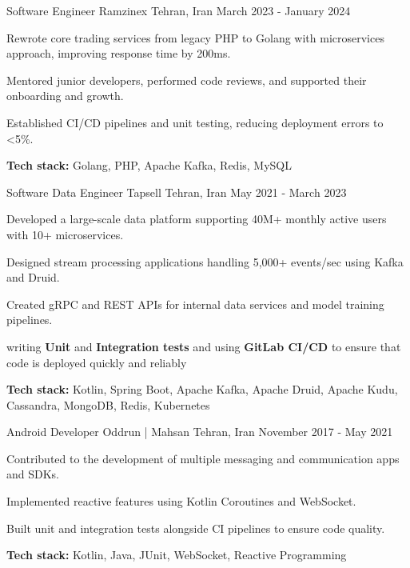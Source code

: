 \begin{cventries}
    
  \cventry
    {Software Engineer} %
    {Ramzinex} %
    {Tehran, Iran} %
    {March 2023 - January 2024} %
    {
      \begin{cvitems} %
        \item Rewrote core trading services from legacy PHP to Golang with microservices approach, improving response time by 200ms.
        \item Mentored junior developers, performed code reviews, and supported their onboarding and growth.
        \item Established CI/CD pipelines and unit testing, reducing deployment errors to <5\%.
        \item \textbf{Tech stack:} Golang, PHP, Apache Kafka, Redis, MySQL
      \end{cvitems}
    }

    \cventry
    {Software Data Engineer} %
    {Tapsell} %
    {Tehran, Iran} %
    {May 2021 - March 2023} %
    {
      \begin{cvitems} %
        \item Developed a large-scale data platform supporting 40M+ monthly active users with 10+ microservices.
        \item Designed stream processing applications handling 5,000+ events/sec using Kafka and Druid.
        \item Created gRPC and REST APIs for internal data services and model training pipelines.
        \item writing \textbf{Unit} and \textbf{Integration tests} and using \textbf{GitLab CI/CD} to ensure that code is deployed quickly and reliably
        \item \textbf{Tech stack:} Kotlin, Spring Boot, Apache Kafka, Apache Druid, Apache Kudu, Cassandra, MongoDB, Redis, Kubernetes
      \end{cvitems}
    }

    \cventry
    {Android Developer} %
    {Oddrun | Mahsan} %
    {Tehran, Iran} %
    {November 2017 - May 2021} %
    {
      \begin{cvitems} %
        \item Contributed to the development of multiple messaging and communication apps and SDKs.
        \item Implemented reactive features using Kotlin Coroutines and WebSocket.
        \item Built unit and integration tests alongside CI pipelines to ensure code quality.
        \item \textbf{Tech stack:} Kotlin, Java, JUnit, WebSocket, Reactive Programming
      \end{cvitems}
    }

\end{cventries}
